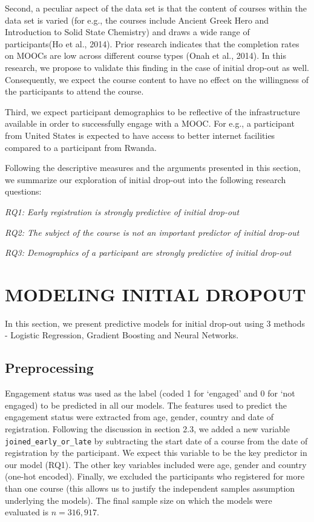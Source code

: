 \documentclass[12pt,]{article}
\begin{document}
Second, a peculiar aspect of the data set is that the content of courses
within the data set is varied (for e.g., the courses include Ancient
Greek Hero and Introduction to Solid State Chemistry) and draws a wide
range of participants(Ho et al., 2014). Prior research indicates that
the completion rates on MOOCs are low across different course types
(Onah et al., 2014). In this research, we propose to validate this
finding in the case of initial drop-out as well. Consequently, we expect
the course content to have no effect on the willingness of the
participants to attend the course.

Third, we expect participant demographics to be reflective of the
infrastructure available in order to successfully engage with a MOOC.
For e.g., a participant from United States is expected to have access to
better internet facilities compared to a participant from Rwanda.

Following the descriptive measures and the arguments presented in this
section, we summarize our exploration of initial drop-out into the
following research questions:

\emph{RQ1: Early registration is strongly predictive of initial
drop-out}

\emph{RQ2: The subject of the course is not an important predictor of
initial drop-out}

\emph{RQ3: Demographics of a participant are strongly predictive of
initial drop-out}

\section{MODELING INITIAL DROPOUT}\label{modeling-initial-dropout}

In this section, we present predictive models for initial drop-out using
3 methods - Logistic Regression, Gradient Boosting and Neural Networks.

\subsection{Preprocessing}\label{preprocessing}

Engagement status was used as the label (coded 1 for `engaged' and 0 for
`not engaged) to be predicted in all our models. The features used to
predict the engagement status were extracted from age, gender, country
and date of registration. Following the discussion in section 2.3, we
added a new variable \texttt{joined\_early\_or\_late} by subtracting the
start date of a course from the date of registration by the participant.
We expect this variable to be the key predictor in our model (RQ1). The
other key variables included were age, gender and country (one-hot
encoded). Finally, we excluded the participants who registered for more
than one course (this allows us to justify the independent samples
assumption underlying the models). The final sample size on which the
models were evaluated is \(n = 316,917\).
\end{document}

